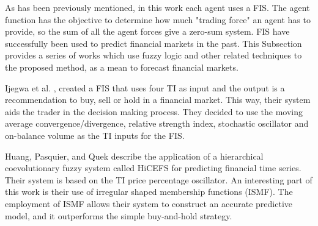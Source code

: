 \documentclass[a4paper,twoside]{article}
\begin{document}

As has been previously mentioned, in this work each agent uses a FIS. The agent function has the objective to
determine how much "trading force" an agent has to provide, so the sum
of all the agent forces give a zero-sum system. FIS have successfully
been used to predict financial markets in the past. This Subsection
provides a series of works which use fuzzy logic and other related
techniques to the proposed method, as a mean to forecast financial
markets. 

Ijegwa et al. \cite{Ijegwa2014}, created a FIS that uses four TI as
input and the output is a recommendation to buy, sell or hold in a
financial market. This way, their system aids the trader in the
decision making process. They decided to use the moving average
convergence/divergence, relative strength index, stochastic oscillator
and on-balance volume as the TI inputs for the FIS. 

Huang, Pasquier, and Quek \cite{Huang2009} describe the application of
a hierarchical coevolutionary fuzzy system called HiCEFS for
predicting financial time series. Their system is based on the TI
price percentage oscillator. An interesting part of this work is their
use of irregular shaped membership functions (ISMF). The employment of
ISMF allows their system to construct an accurate predictive model,
and it outperforms the simple buy-and-hold strategy. 



\end{document}
